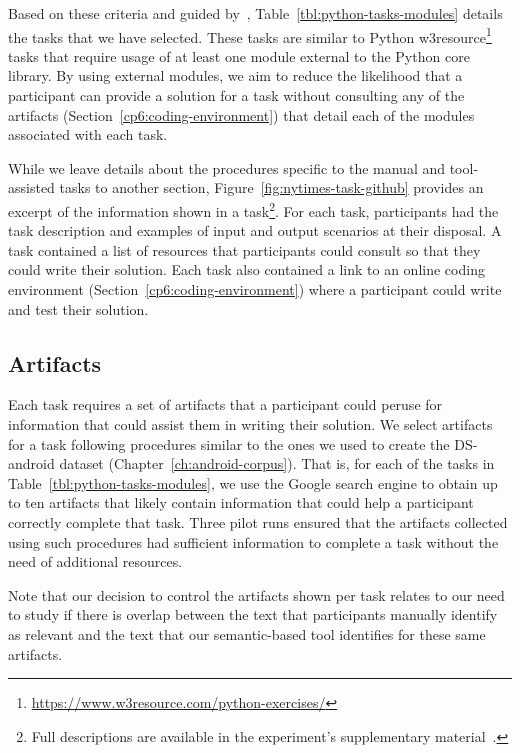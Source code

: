 Based on these criteria and guided by~\cite{thiselton2019},
Table~\ref{tbl:python-tasks-modules} details the tasks that we have selected. 
These tasks are similar to 
Python w3resource\footnote{\url{https://www.w3resource.com/python-exercises/}} tasks
that require usage of at least one module external to the Python core library.
By using external modules, we aim to reduce the likelihood that a participant 
can provide a solution for a task without consulting any of the artifacts (Section~\ref{cp6:coding-environment})
that detail each of the modules associated with each task. 



While we leave details about the procedures specific to the manual and tool-assisted tasks to another section, Figure~\ref{fig:nytimes-task-github} provides an excerpt of the information shown in a task\footnote{Full descriptions are available in the experiment's supplementary material~\red{\cite{}}.}.
For each task, participants had the task description and examples of input and output scenarios at their disposal. A task contained a list of resources that participants could consult 
so that they could write their solution.
Each task also contained a link to an online coding environment (Section~\ref{cp6:coding-environment})
where a participant could write and test their solution. 





\subsection{Artifacts}
\label{cp6:experiment-artifacts}


Each task requires a set of artifacts that a participant could peruse for information that could assist them in writing their solution.
We select artifacts for a task following procedures similar to the ones we used to create the \acs{DS-android} dataset (Chapter~\ref{ch:android-corpus}). 
That is, for each of the tasks in Table~\ref{tbl:python-tasks-modules}, we use the Google search engine to obtain up to ten artifacts that likely contain 
information that could help a participant correctly complete that task. 
Three pilot runs ensured that the artifacts collected using such procedures had sufficient information to complete a task without 
the need of additional resources. 

Note that our decision to control the artifacts shown per task relates to our need to study if there is overlap between the text that participants manually identify as relevant and the text that our semantic-based tool identifies for these same artifacts. 





